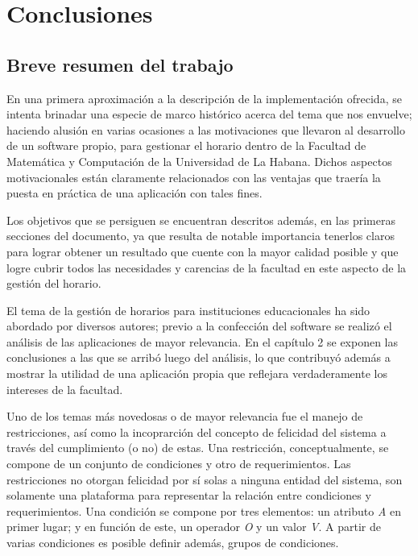 \chapter{Conclusiones}

\section{Breve resumen del trabajo}

En una primera aproximación a la descripción de la implementación ofrecida, se intenta brinadar una especie de marco histórico acerca del tema que nos envuelve; haciendo alusión en varias ocasiones a las motivaciones que llevaron al desarrollo de un software propio, para gestionar el horario dentro de la Facultad de Matemática y Computación de la Universidad de La Habana. Dichos aspectos motivacionales están claramente relacionados con las ventajas que traería la puesta en práctica de una aplicación con tales fines. 

Los objetivos que se persiguen se encuentran descritos además, en las primeras secciones del documento, ya que resulta de notable importancia tenerlos claros para lograr obtener un resultado que cuente con la mayor calidad posible y que logre cubrir todos las necesidades y carencias de la facultad en este aspecto de la gestión del horario. 

El tema de la gestión de horarios para instituciones educacionales ha sido abordado por diversos autores; previo a la confección del software se realizó el análisis de las aplicaciones de mayor relevancia. En el capítulo 2 se exponen las conclusiones a las que se arribó luego del análisis, lo que contribuyó además a mostrar la utilidad de una aplicación propia que reflejara verdaderamente los intereses de la facultad.

Uno de los temas más novedosas o de mayor relevancia fue el manejo de restricciones, así como la incoprarción del concepto de felicidad del sistema a través del cumplimiento (o no) de estas. Una restricción, conceptualmente, se compone de un conjunto de condiciones y otro de requerimientos.  Las restricciones no otorgan felicidad por sí solas a ninguna entidad del sistema, son solamente una plataforma para representar la relación entre condiciones y requerimientos.
Una condición se compone por tres elementos: un atributo \textit{A} en primer lugar; y en función de este, un operador \textit{O} y un valor \textit{V}. A partir de varias condiciones es posible definir además, grupos de condiciones. 

